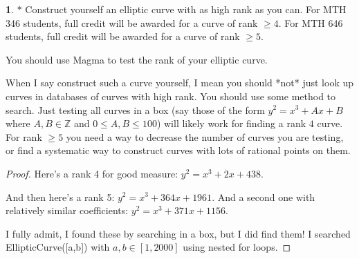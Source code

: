 \documentclass[12pt]{article}
\theoremstyle{definition}
\newtheorem{ex}{}
\begin{document}
\begin{ex}
	$*$ Construct yourself an elliptic curve with as high rank as you can.
	For MTH 346 students, full credit will be awarded for a curve of rank $\geq 4$.
	For MTH 646 students, full credit will be awarded for a curve of rank $\geq 5$.

	You should use Magma to test the rank of your elliptic curve.

	When I say construct such a curve yourself, I mean you should *not* just
	look up curves in databases of curves with high rank. You should use some
	method to search. Just testing all curves in a box (say those of the form
	$y^{2} = x^{3} + Ax + B$ where $A, B \in \mathbb{Z}$ and $0 \leq A,B \leq 100$) will likely work for finding a rank $4$ curve. For rank $\geq 5$ you need a way to decrease the number of curves
	you are testing, or find a systematic way to construct curves with lots of rational points on them.
\end{ex}
\begin{proof}
	Here's a rank 4 for good measure: $y^2 = x^3 + 2x + 438$.

	And then here's a rank 5: $y^2 = x^3 + 364x + 1961$.
	And a second one with relatively similar coefficients: $y^2 = x^3 + 371x + 1156$.

	I fully admit, I found these by searching in a box, but I did find them!
	I searched EllipticCurve([a,b]) with $a,b \in [1, 2000]$ using nested for loops.
\end{proof}
\end{document}
